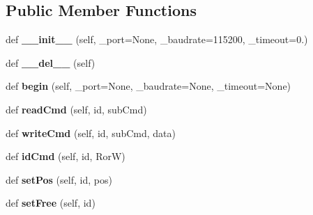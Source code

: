 \subsection*{Public Member Functions}
\begin{DoxyCompactItemize}
\item 
def {\bfseries \+\_\+\+\_\+init\+\_\+\+\_\+} (self, \+\_\+port=None, \+\_\+baudrate=115200, \+\_\+timeout=0.)\hypertarget{classkondoServoLib_1_1icsCtrl_1_1IcsClass_a406e99d98fe5ce6181fc3ae3bf4a530a}{}\label{classkondoServoLib_1_1icsCtrl_1_1IcsClass_a406e99d98fe5ce6181fc3ae3bf4a530a}

\item 
def {\bfseries \+\_\+\+\_\+del\+\_\+\+\_\+} (self)\hypertarget{classkondoServoLib_1_1icsCtrl_1_1IcsClass_a3e9191c28f5cccec5c5bcd999193038b}{}\label{classkondoServoLib_1_1icsCtrl_1_1IcsClass_a3e9191c28f5cccec5c5bcd999193038b}

\item 
def {\bfseries begin} (self, \+\_\+port=None, \+\_\+baudrate=None, \+\_\+timeout=None)\hypertarget{classkondoServoLib_1_1icsCtrl_1_1IcsClass_a9fbca8361c052597d207a95397f4ca38}{}\label{classkondoServoLib_1_1icsCtrl_1_1IcsClass_a9fbca8361c052597d207a95397f4ca38}

\item 
def {\bfseries read\+Cmd} (self, id, sub\+Cmd)\hypertarget{classkondoServoLib_1_1icsCtrl_1_1IcsClass_a0d65ad4731c502b5e2297ac278ef6570}{}\label{classkondoServoLib_1_1icsCtrl_1_1IcsClass_a0d65ad4731c502b5e2297ac278ef6570}

\item 
def {\bfseries write\+Cmd} (self, id, sub\+Cmd, data)\hypertarget{classkondoServoLib_1_1icsCtrl_1_1IcsClass_a4800d3a988f701ea747a621687364421}{}\label{classkondoServoLib_1_1icsCtrl_1_1IcsClass_a4800d3a988f701ea747a621687364421}

\item 
def {\bfseries id\+Cmd} (self, id, RorW)\hypertarget{classkondoServoLib_1_1icsCtrl_1_1IcsClass_a0d6981c5d3ef401dd3b9951e841103ad}{}\label{classkondoServoLib_1_1icsCtrl_1_1IcsClass_a0d6981c5d3ef401dd3b9951e841103ad}

\item 
def {\bfseries set\+Pos} (self, id, pos)\hypertarget{classkondoServoLib_1_1icsCtrl_1_1IcsClass_a94a5f6a77f91b645667956919bfcf345}{}\label{classkondoServoLib_1_1icsCtrl_1_1IcsClass_a94a5f6a77f91b645667956919bfcf345}

\item 
def {\bfseries set\+Free} (self, id)\hypertarget{classkondoServoLib_1_1icsCtrl_1_1IcsClass_a406e9746deb4acb4bbafddc7a1f93f6e}{}\label{classkondoServoLib_1_1icsCtrl_1_1IcsClass_a406e9746deb4acb4bbafddc7a1f93f6e}


\end{DoxyCompactItemize}
